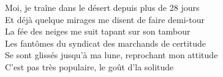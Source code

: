Moi, je traîne dans le désert depuis plus de 28 jours \\
Et déjà quelque mirages me disent de faire demi-tour \\
La fée des neiges me suit tapant sur son tambour \\

Les fantômes du syndicat des marchands de certitude \\
Se sont glissés jusqu'à ma lune, reprochant mon attitude \\
C'est pas très populaire, le goût d'la solitude \\

